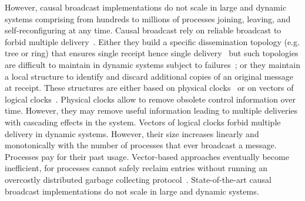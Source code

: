 However, causal broadcast implementations do not scale in large and dynamic
systems comprising from hundreds to millions of processes joining, leaving, and
self-reconfiguring at any time.
%
Causal broadcast rely on reliable broadcast to forbid multiple
delivery~\cite{hadzilacos1994modular}. %
Either they build a specific dissemination topology (e.g. tree or ring) that
ensures single receipt hence single
delivery~\cite{bravo2017saturn,raynal2013distributed} but such topologies are
difficult to maintain in dynamic systems subject to
failures~\cite{krasikova2016hashtable}; or they maintain a local structure to
identify and discard additional copies of an original message at receipt. These
structures are either based on physical
clocks~\cite{cachin2011introduction,demers1987epidemic} or on vectors of logical
clocks~\cite{malkhi2007concise,mukund2014optimized}. Physical clocks allow to
remove obsolete control information over time. However, they may remove useful
information leading to multiple deliveries with cascading effects in the
system. Vectors of logical clocks forbid multiple delivery in dynamic
systems. However, their size increases linearly and monotonically with the
number of processes that ever broadcast a message. Processes pay for their past
usage. Vector-based approaches eventually become inefficient, for processes
cannot safely reclaim entries without running an overcostly distributed garbage
collecting protocol~\cite{abdullahi1998garbage}. State-of-the-art causal
broadcast implementations do not scale in large and dynamic systems.


